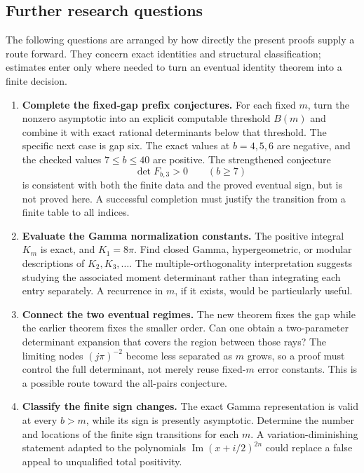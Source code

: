 \subsection{Further research questions}

The following questions are arranged by how directly the present
proofs supply a route forward. They concern exact identities and
structural classification; estimates enter only where needed to
turn an eventual identity theorem into a finite decision.

\begin{enumerate}[label=\textbf{\arabic*.},leftmargin=*]
\item \textbf{Complete the fixed-gap prefix conjectures.}
For each fixed $m$, turn the nonzero asymptotic into an explicit
computable threshold $B(m)$ and combine it with exact rational
determinants below that threshold. The specific next case is gap
six. The exact values at $b=4,5,6$ are negative, and the checked
values $7\le b\le40$ are positive. The strengthened conjecture
\[
 \det F_{b,3}>0\qquad(b\ge7)
\]
is consistent with both the finite data and the proved eventual
sign, but is not proved here. A successful completion must justify
the transition from a finite table to all indices.

\item \textbf{Evaluate the Gamma normalization constants.}
The positive integral $K_m$ is exact, and $K_1=8\pi$.
Find closed Gamma, hypergeometric, or modular descriptions of
$K_2,K_3,\ldots$. The multiple-orthogonality interpretation suggests
studying the associated moment determinant rather than integrating
each entry separately. A recurrence in $m$, if it exists, would be
particularly useful.

\item \textbf{Connect the two eventual regimes.}
The new theorem fixes the gap while the earlier theorem fixes the
smaller order. Can one obtain a two-parameter determinant expansion
that covers the region between those rays? The limiting nodes
$(j\pi)^{-2}$ become less separated as $m$ grows, so a proof must
control the full determinant, not merely reuse fixed-$m$ error
constants. This is a possible route toward the all-pairs conjecture.

\item \textbf{Classify the finite sign changes.}
The exact Gamma representation is valid at every $b>m$, while its
sign is presently asymptotic. Determine the number and locations of
the finite sign transitions for each $m$. A variation-diminishing
statement adapted to the polynomials
$\operatorname{Im}(x+i/2)^{2n}$ could replace a false appeal to
unqualified total positivity.


\end{enumerate}
